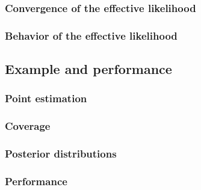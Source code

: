 \subsubsection{Convergence of the effective likelihood\label{sec:llhconvergence}}
\begingroup
\graphicspath{{results/mcllh_paper/}}

\endgroup

\subsubsection{Behavior of the effective likelihood\label{sec:llhbehavior}}
\begingroup
\graphicspath{{results/mcllh_paper/}}

\endgroup

\subsection{Example and performance\label{sec:example}}
\begingroup
\graphicspath{{results/mcllh_paper/}}

\endgroup

\subsubsection{Point estimation\label{sec:pointestimation}}
\begingroup
\graphicspath{{results/mcllh_paper/}}

\endgroup

\subsubsection{Coverage\label{sec:coverage}}
\begingroup
\graphicspath{{results/mcllh_paper/}}

\endgroup

\subsubsection{Posterior distributions\label{sec:posterior}}
\begingroup
\graphicspath{{results/mcllh_paper/}}

\endgroup

\subsubsection{Performance\label{sec:performance}}
\begingroup
\graphicspath{{results/mcllh_paper/}}

\endgroup

